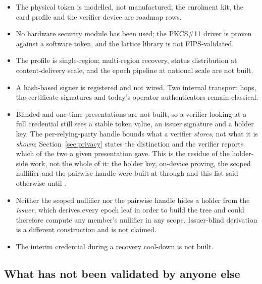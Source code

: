 \begin{itemize}
  \item The physical token is modelled, not manufactured; the enrolment kit, the card profile and
    the verifier device are roadmap rows.
  \item No hardware security module has been used; the PKCS\#11 driver is proven against a software
    token, and the lattice library is not FIPS-validated.
  \item The profile is single-region; multi-region recovery, status distribution at content-delivery
    scale, and the epoch pipeline at national scale are not built.
  \item A hash-based signer is registered and not wired. Two internal transport hops, the
    certificate signatures and today's operator authenticators remain classical.
  \item Blinded and one-time presentations are not built, so a verifier looking at a full
    credential still sees a stable token value, an issuer signature and a holder key. The
    per-relying-party handle bounds what a verifier \emph{stores}, not what it is \emph{shown};
    Section~\ref{sec:privacy} states the distinction and the verifier reports which of the two a
    given presentation gave. This is the residue of the holder-side work, not the whole of it: the
    holder key, on-device proving, the scoped nullifier and the pairwise handle were built at
     through  and this list said otherwise until .
  \item Neither the scoped nullifier nor the pairwise handle hides a holder from the \emph{issuer},
    which derives every epoch leaf in order to build the tree and could therefore compute any
    member's nullifier in any scope. Issuer-blind derivation is a different construction and is not
    claimed.
  \item The interim credential during a recovery cool-down is not built.
\end{itemize}

\subsection{What has not been validated by anyone else}

